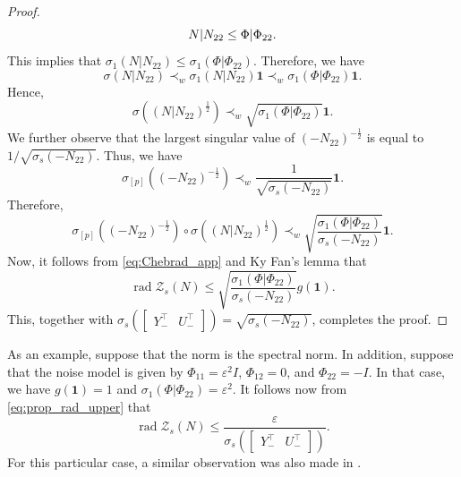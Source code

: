\documentclass[pdflatex,sn-mathphys-num]{sn-jnl}%
\DeclareMathOperator{\rad}{rad}
\theoremstyle{thmstyleone}
\begin{document}
\begin{proof}
\begin{equation}
\label{eq:pf_N|N_{22}}
N|N_{22}\leq\Phi|\Phi_{22}.
\end{equation}
This implies that $\sigma_1(N|N_{22})\leq\sigma_1(\Phi|\Phi_{22})$. Therefore, we have
\begin{equation}
\sigma(N|N_{22})\prec_w \sigma_1(N|N_{22}) \mathbf{1} \prec_w \sigma_1(\Phi|\Phi_{22}) \mathbf{1}.
\end{equation}
Hence,
\begin{equation}
\sigma((N|N_{22})^{\frac{1}{2}})\prec_w \sqrt{\sigma_1(\Phi|\Phi_{22})} \mathbf{1}.
\end{equation}
We further observe that the largest singular value of $(-N_{22})^{-\frac{1}{2}}$ is equal to $1/\sqrt{\sigma_s(-N_{22})}$. Thus, we have
\begin{equation}
\sigma_{[p]}((-N_{22})^{-\frac{1}{2}})\prec_w \frac{1}{\sqrt{\sigma_s(-N_{22})}} \mathbf{1}.
\end{equation}
Therefore,
\begin{equation}
\sigma_{[p]}((-N_{22})^{-\frac{1}{2}})\circ \sigma((N|N_{22})^{\frac{1}{2}})\prec_w \sqrt{\frac{\sigma_1(\Phi|\Phi_{22})}{\sigma_s(-N_{22})}} \mathbf{1}.
\end{equation}
Now, it follows from \eqref{eq:Chebrad_app} and Ky Fan's lemma \cite[Prop. 4.B.6]{marshall2011inequalities} that
\begin{equation}
\rad\mathcal{Z}_s(N)\leq \sqrt{\frac{\sigma_1(\Phi|\Phi_{22})}{\sigma_s(-N_{22})}}g(\mathbf{1}).
\end{equation}
This, together with $\sigma_{s}\left(\begin{bmatrix}
Y_-^\top & U_-^\top
\end{bmatrix}\right)=\sqrt{\sigma_s(-N_{22})}$, completes the proof.
\end{proof}

As an example, suppose that the norm is the spectral norm. In addition, suppose that the noise model is given by $\Phi_{11}=\varepsilon^2 I$, $\Phi_{12}=0$, and $\Phi_{22}=-I$. In that case, we have $g(\mathbf{1})=1$ and $\sigma_1(\Phi|\Phi_{22})=\varepsilon^2$. It follows now from \eqref{eq:prop_rad_upper} that
\begin{equation}
\rad\mathcal{Z}_s(N)\leq \frac{\varepsilon}{\sigma_{s}\left(\begin{bmatrix}
Y_-^\top & U_-^\top
\end{bmatrix}\right)}.
\end{equation}
For this particular case, a similar observation was also made in \cite[Ex. 1]{coulson2022quantitative}.
\end{document}
